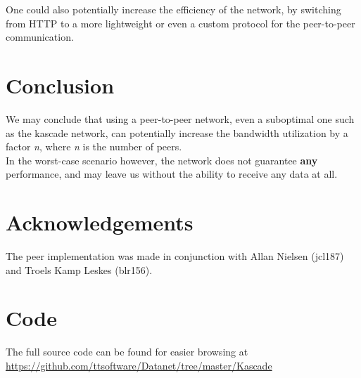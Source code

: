 \documentclass{acm_proc_article-sp}
\begin{document}
One could also potentially increase the efficiency of the network, by switching from HTTP to a more lightweight or even a custom protocol for the peer-to-peer communication. 

\section{Conclusion}
We may conclude that using a peer-to-peer network, even a suboptimal one such as the kascade network, can potentially increase the bandwidth utilization by a factor \textit{n}, where \textit{n} is the number of peers.\\
In the worst-case scenario however, the network does not guarantee \textbf{any} performance, and may leave us without the ability to receive any data at all. 

\section{Acknowledgements}
The peer implementation was made in conjunction with Allan Nielsen (jcl187) and Troels Kamp Leskes (blr156). 

\onecolumn

\appendix

\section{Code}
The full source code can be found for easier browsing at \url{https://github.com/ttsoftware/Datanet/tree/master/Kascade}
\end{document}
